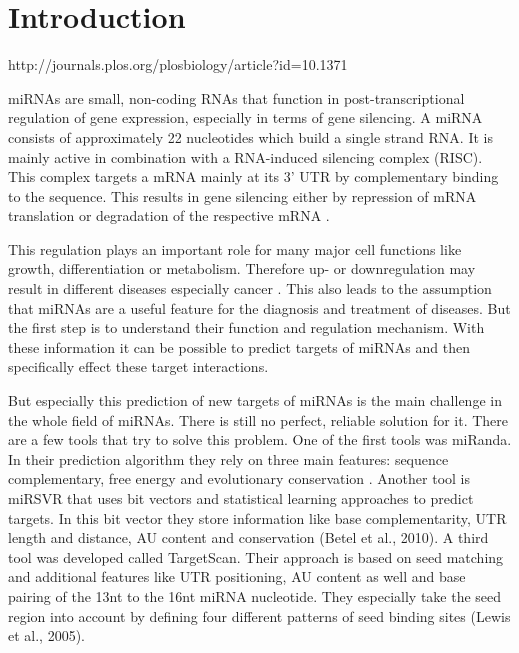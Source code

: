 \documentclass[12pt]{article}
\begin{document}
\tableofcontents

\newpage 
{}







\section{Introduction}

http://journals.plos.org/plosbiology/article?id=10.1371%


miRNAs are small, non-coding RNAs that function in post-transcriptional regulation of gene expression, especially in terms of gene silencing. A miRNA consists of approximately 22 nucleotides which build a single strand RNA. It is mainly active in combination with a RNA-induced silencing complex (RISC). This complex targets a mRNA mainly at its 3' UTR by complementary binding to the sequence. This results in gene silencing either by repression of mRNA translation or degradation of the respective mRNA \cite{Enright}. 
  
This regulation plays an important role for many major cell functions like growth, differentiation or metabolism. Therefore up- or downregulation may result in different diseases especially cancer \cite{Ardekani}. This also leads to the assumption that miRNAs are a useful feature for the diagnosis and treatment of diseases. But the first step is to understand their function and regulation mechanism. With these information it can be possible to predict targets of miRNAs and then specifically effect these target interactions.  

But especially this prediction of new targets of miRNAs is the main challenge in the whole field of miRNAs. There is still no perfect, reliable solution for it. There are a few tools that try to solve this problem. One of the first tools was miRanda. In their prediction algorithm they rely on three main features: sequence complementary, free energy and evolutionary conservation \cite{Enright}. Another tool is miRSVR that uses bit vectors and statistical learning approaches to predict targets. In this bit vector they store information like base complementarity, UTR length and distance, AU content and conservation (Betel et al., 2010). A third tool was developed called TargetScan. Their approach is based on seed matching and additional features like UTR positioning, AU content as well and base pairing of the 13nt to the 16nt miRNA nucleotide. They especially take the seed region into account by defining four different patterns of seed binding sites (Lewis et al., 2005).
\end{document}
